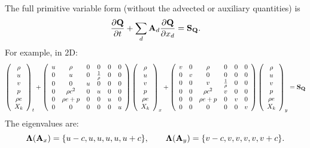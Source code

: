 The full primitive variable form (without the advected or auxiliary quantities) is
\begin{equation}
\frac{\partial{\bf Q}}{\partial t} + \sum_d {\bf A}_d\frac{\partial{\bf Q}}{\partial x_d} = {\bf S}_{{\bf Q}}.
\end{equation}
For example, in 2D:
\begin{equation}
\left(\begin{array}{c}
\rho \\
u \\
v \\
p \\
\rho e \\
X_k
\end{array}\right)_t
+
\left(\begin{array}{cccccc}
u & \rho & 0 & 0 & 0 & 0 \\
0 & u & 0 & \frac{1}{\rho} & 0 & 0 \\
0 & 0 & u & 0 & 0 & 0 \\
0 & \rho c^2 & 0 & u & 0 & 0 \\
0 & \rho e + p & 0 & 0 & u & 0 \\
0 & 0 & 0 & 0 & 0 & u
\end{array}\right)
\left(\begin{array}{c}
\rho \\
u \\
v \\
p \\
\rho e \\
X_k
\end{array}\right)_x
+
\left(\begin{array}{cccccc}
v & 0 & \rho & 0 & 0 & 0 \\
0 & v & 0 & 0 & 0 & 0 \\
0 & 0 & v & \frac{1}{\rho} & 0 & 0 \\
0 & 0 & \rho c^2 & v & 0 & 0 \\
0 & 0 & \rho e + p & 0 & v & 0 \\
0 & 0 & 0 & 0 & 0 & v
\end{array}\right)
\left(\begin{array}{c}
\rho \\
u \\
v \\
p \\
\rho e \\
X_k
\end{array}\right)_y
=
{\bf S}_{\bf Q}
\end{equation}
The eigenvalues are:
\begin{equation}
{\bf \Lambda}({\bf A}_x) = \{u-c,u,u,u,u,u+c\}, \qquad {\bf \Lambda}({\bf A}_y) = \{v-c,v,v,v,v,v+c\} .
\end{equation}
